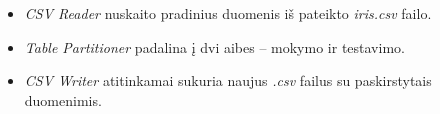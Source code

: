 \begin{itemize}
    \item \textit{CSV Reader} nuskaito pradinius duomenis iš pateikto \textit{iris.csv} failo.
    \item \textit{Table Partitioner} padalina į dvi aibes – mokymo ir testavimo.
    \item \textit{CSV Writer} atitinkamai sukuria naujus \textit{.csv} failus su paskirstytais duomenimis.
\end{itemize}